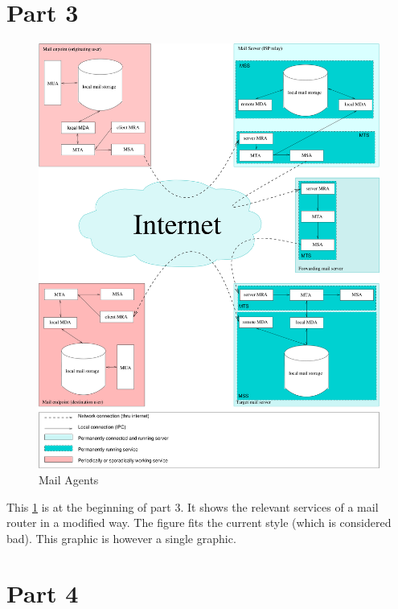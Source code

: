 \documentclass[11pt]{extarticle}
\begin{document}
	\section{Part 3}
	\begin{figure}[!h]
		\centering\includegraphics[width=\columnwidth]{inc/MailAgents1.pdf}
		\caption{Mail Agents}
		\label{fig:MailAgents}
	\end{figure}
	This \cref{fig:MailAgents} is at the beginning of part 3. It shows the relevant services of a mail router in a modified way. The figure fits the current style (which is considered bad). This graphic is however a single graphic.
	
	\section{Part 4}
	
\end{document}
